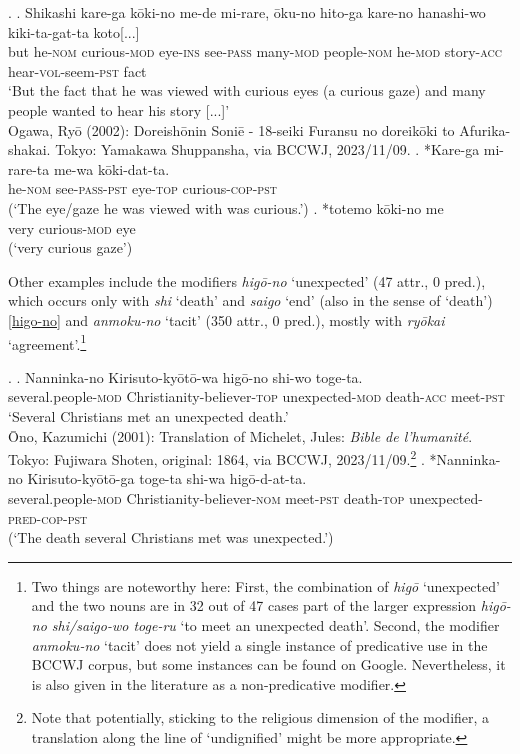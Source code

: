 \ex. \ag. Shikashi kare-ga kōki-no me-de mi-rare, ōku-no hito-ga kare-no hanashi-wo kiki-ta-gat-ta koto[...]\\
but he-\textsc{nom} curious-\textsc{mod} eye-\textsc{ins} see-\textsc{pass} many-\textsc{mod} people-\textsc{nom} he-\textsc{mod} story-\textsc{acc} hear-\textsc{vol}-seem-\textsc{pst} fact\\
`But the fact that he was viewed with curious eyes (a curious gaze) and many people wanted to hear his story [...]’\\ Ogawa, Ryō (2002): Doreishōnin Soniē - 18-seiki Furansu no doreikōki to Afurika-shakai. Tokyo: Yamakawa Shuppansha, via BCCWJ, 2023/11/09.
\bg. *Kare-ga mi-rare-ta me-wa kōki-dat-ta.\\
he-\textsc{nom} see-\textsc{pass-pst} eye-\textsc{top} curious-\textsc{cop-pst}\\
(`The eye/gaze he was viewed with was curious.’)
\cg. *totemo kōki-no me\\
very curious-\textsc{mod} eye\\
(`very curious gaze’)

Other examples include the modifiers \textit{higō-no} `unexpected’ (47 attr., 0 pred.), which occurs only with \textit{shi} `death’ and \textit{saigo} `end’ (also in the sense of `death’) \ref{higo-no} and \textit{anmoku-no} `tacit’ (350 attr., 0 pred.), mostly with \textit{ryōkai} `agreement’.\footnote{Two things are noteworthy here: First, the combination of \textit{higō} `unexpected’ and the two nouns are in 32 out of 47 cases part of the larger expression \textit{higō-no shi/saigo-wo toge-ru} `to meet an unexpected death’. Second, the modifier \textit{anmoku-no} `tacit’ does not yield a single instance of predicative use in the BCCWJ corpus, but some instances can be found on Google. Nevertheless, it is also given in the literature \citep{muraki:2012:nihongo, lehmann:2015:japanisch} as a non-predicative modifier.}

\ex. \label{higo-no} \ag. Nanninka-no Kirisuto-kyōtō-wa higō-no shi-wo toge-ta.\\
several.people-\textsc{mod} Christianity-believer-\textsc{top} unexpected-\textsc{mod} death-\textsc{acc} meet-\textsc{pst}\\
`Several Christians met an unexpected death.’\\ Ōno, Kazumichi (2001): Translation of Michelet, Jules: \textit{Bible de l’humanité}. Tokyo: Fujiwara Shoten, original: 1864, via BCCWJ, 2023/11/09.\footnote{Note that potentially, sticking to the religious dimension of the modifier, a translation along the line of `undignified’ might be more appropriate.}
\bg. *Nanninka-no Kirisuto-kyōtō-ga toge-ta shi-wa higō-d-at-ta.\\
several.people-\textsc{mod} Christianity-believer-\textsc{nom} meet-\textsc{pst} death-\textsc{top} unexpected-\textsc{pred-cop-pst}\\
(`The death several Christians met was unexpected.’)

